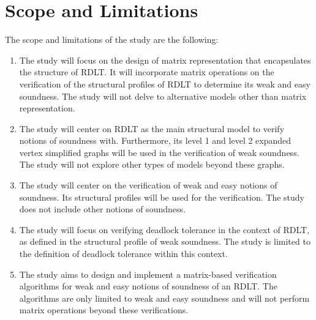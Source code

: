\section{Scope and Limitations}
The scope and limitations of the study are the following:
\begin{enumerate}
    \item The study will focus on the design of matrix representation that encapsulates the structure of RDLT. It will incorporate matrix operations on the verification of the structural profiles of RDLT to determine its weak and easy soundness. The study will not delve to alternative models other than matrix representation.
    \item The study will center on RDLT as the main structural model to verify notions of soundness with. Furthermore, its level 1 and level 2 expanded vertex simplified graphs will be used in the verification of weak soundness. The study will not explore other types of models beyond these graphs.
    \item The study will center on the verification of weak and easy notions of soundness. Its structural profiles will be used for the verification. The study does not include other notions of soundness.
    \item The study will focus on verifying deadlock tolerance in the context of RDLT, as defined in the structural profile of weak soundness. The study is limited to the definition of deadlock tolerance within this context.
    \item The study aims to design and implement a matrix-based verification algorithms for weak and easy notions of soundness of an RDLT. The algorithms are only limited to weak and easy soundness and will not perform matrix operations beyond these verifications.
\end{enumerate}

